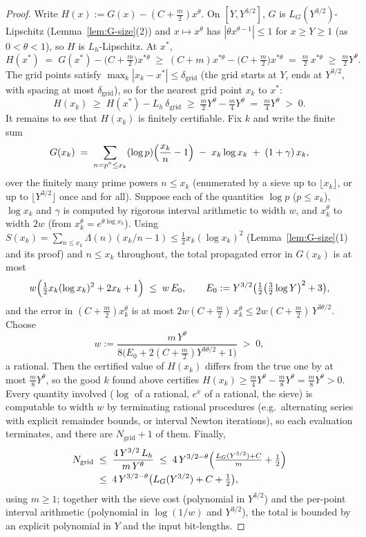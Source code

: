 \documentclass[11pt]{amsart}
\numberwithin{equation}{section}
\newcommand{\Lam}{\Lambda}
\newcommand{\Euler}{\gamma}
\begin{document}
\begin{proof}
Write $H(x) := G(x) - (C + \tfrac{m}{2})x^{\theta}$. On $[Y, Y^{3/2}]$,
$G$ is $L_G(Y^{3/2})$-Lipschitz (Lemma~\ref{lem:G-size}(2)) and
$x \mapsto x^{\theta}$ has $|\theta x^{\theta-1}| \le 1$ for
$x \ge Y \ge 1$ (as $0 < \theta < 1$), so $H$ is $L_h$-Lipschitz. At
$x^*$,
\[
H(x^*) \;=\; G(x^*) - \bigl(C+\tfrac{m}{2}\bigr) x^{*\theta}
\;\ge\; (C+m)x^{*\theta} - \bigl(C+\tfrac{m}{2}\bigr)x^{*\theta}
\;=\; \tfrac{m}{2}\,x^{*\theta} \;\ge\; \tfrac{m}{2}Y^{\theta}.
\]
The grid points satisfy $\max_k |x_k - x^*| \le \delta_{\mathrm{grid}}$
(the grid starts at $Y$, ends at $Y^{3/2}$, with spacing at most
$\delta_{\mathrm{grid}}$), so for the nearest grid point $x_k$ to
$x^*$:
\[
H(x_k) \;\ge\; H(x^*) - L_h\,\delta_{\mathrm{grid}}
\;\ge\; \tfrac{m}{2}Y^{\theta} - \tfrac{m}{4}Y^{\theta}
\;=\; \tfrac{m}{4}Y^{\theta} \;>\; 0.
\]
It remains to see that $H(x_k)$ is finitely certifiable. Fix $k$ and
write the finite sum
\[
G(x_k) \;=\; \sum_{\substack{n = p^a \le x_k}} (\log p)
\Bigl(\frac{x_k}{n} - 1\Bigr) \;-\; x_k \log x_k \;+\; (1+\Euler)\,x_k ,
\]
over the finitely many prime powers $n \le x_k$ (enumerated by a
sieve up to $\lfloor x_k \rfloor$, or up to $\lfloor Y^{3/2}\rfloor$
once and for all). Suppose each of the quantities
$\log p$ ($p \le x_k$), $\log x_k$ and $\Euler$ is computed by
rigorous interval arithmetic to width $w$, and $x_k^{\theta}$ to
width $2w$ (from $x_k^{\theta} = e^{\theta\log x_k}$). Using
$S(x_k) = \sum_{n \le x_k}\Lam(n)(x_k/n - 1) \le
\tfrac12 x_k(\log x_k)^2$
(Lemma~\ref{lem:G-size}(1) and its proof) and $n \le x_k$
throughout, the total propagated error in $G(x_k)$ is at most
\[
w\Bigl(\tfrac12 x_k(\log x_k)^2 + 2x_k + 1\Bigr) \;\le\;
w\,E_0, \qquad
E_0 := Y^{3/2}\bigl(\tfrac{1}{2}\bigl(\tfrac32\log Y\bigr)^2 + 3\bigr),
\]
and the error in $(C + \tfrac{m}{2})x_k^{\theta}$ is at most
$2w(C + \tfrac{m}{2})\,x_k^{\theta} \le 2w(C + \tfrac{m}{2})\,Y^{
3\theta/2}$. Choose
\[
w := \frac{m\,Y^{\theta}}{8\bigl(E_0 + 2(C+\tfrac{m}{2})Y^{3\theta/2}
+ 1\bigr)} \;>\; 0,
\]
a rational. Then the certified value of $H(x_k)$ differs from the true
one by at most $\tfrac{m}{8}Y^{\theta}$, so the good $k$ found above
certifies $H(x_k) \ge \tfrac{m}{4}Y^{\theta} - \tfrac{m}{8}Y^{\theta}
= \tfrac{m}{8}Y^{\theta} > 0$. Every quantity involved
($\log$ of a rational, $e^x$ of a rational, the sieve) is computable
to width $w$ by terminating rational procedures (e.g.\ alternating
series with explicit remainder bounds, or interval Newton
iterations), so each evaluation terminates, and there are
$N_{\mathrm{grid}} + 1$ of them. Finally,
\[
\begin{split}
N_{\mathrm{grid}} \;&\le\; \frac{4\,Y^{3/2}\,L_h}{m\,Y^{\theta}}
\;\le\; 4\,Y^{3/2 - \theta}\Bigl(\tfrac{L_G(Y^{3/2}) + C}{m}
+ \tfrac12\Bigr)\\
\;&\le\; 4\,Y^{3/2-\theta}\bigl(L_G(Y^{3/2}) + C + \tfrac12\bigr),
\end{split}
\]
using $m \ge 1$; together with the sieve cost (polynomial in
$Y^{3/2}$) and the per-point interval arithmetic (polynomial in
$\log(1/w)$ and $Y^{3/2}$), the total is bounded by an explicit
polynomial in $Y$ and the input bit-lengths.
\end{proof}
\end{document}
